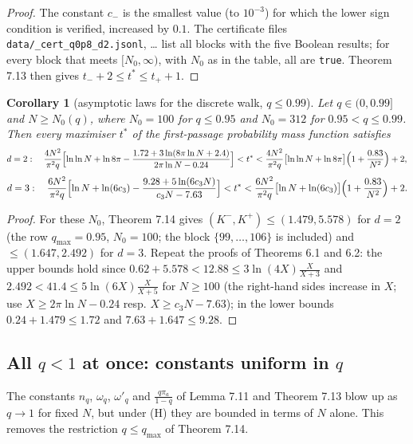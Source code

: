 \documentclass[11pt,a4paper]{article}
\newtheorem{corollary}[theorem]{Corollary}
\theoremstyle{definition}
\theoremstyle{remark}
\begin{document}
\begin{proof}
The constant $c_-$ is the smallest value (to $10^{-3}$) for which the lower sign condition is verified, increased by $0.1$. The certificate files \texttt{data/\_\allowbreak cert\_\allowbreak q0p8\_\allowbreak d2.jsonl}, … list all blocks with the five Boolean results; for every block that meets $[N_0,\infty)$, with $N_0$ as in the table, all are \texttt{true}. Theorem 7.13 then gives $t_-+2\le t^*\le t_++1$.
\end{proof}

\begin{corollary}[{asymptotic laws for the discrete walk, $q\le0.99$}]
Let $q\in(0,0.99]$ and $N\ge N_0(q)$, where $N_0=100$ for $q\le0.95$ and $N_0=312$ for $0.95<q\le0.99$. Then every maximiser $t^*$ of the first-passage probability mass function satisfies
\begin{equation*}
d=2:\quad \frac{4N^2}{\pi^2q}\Bigl[\ln\ln N+\ln8\pi-\frac{1.72+3\ln(8\pi\ln N+2.4)}{2\pi\ln N-0.24}\Bigr]<t^*<\frac{4N^2}{\pi^2q}\bigl[\ln\ln N+\ln8\pi\bigr]\Bigl(1+\frac{0.83}{N^2}\Bigr)+2,
\end{equation*}
\begin{equation*}
d=3:\quad \frac{6N^2}{\pi^2q}\Bigl[\ln N+\ln(6c_3)-\frac{9.28+5\ln(6c_3N)}{c_3N-7.63}\Bigr]<t^*<\frac{6N^2}{\pi^2q}\bigl[\ln N+\ln(6c_3)\bigr]\Bigl(1+\frac{0.83}{N^2}\Bigr)+2 .
\end{equation*}
\end{corollary}

\begin{proof}
For these $N_0$, Theorem 7.14 gives $(K^-,K^+)\le(1.479,5.578)$ for $d=2$ (the row $q_{\max}=0.95$, $N_0=100$; the block $\{99,\dots,106\}$ is included) and $\le(1.647,2.492)$ for $d=3$. Repeat the proofs of Theorems 6.1 and 6.2: the upper bounds hold since $0.62+5.578<12.88\le3\ln(4X)\frac{X}{X+3}$ and $2.492<41.4\le5\ln(6X)\frac{X}{X+5}$ for $N\ge100$ (the right-hand sides increase in $X$; use $X\ge2\pi\ln N-0.24$ resp. $X\ge c_3N-7.63$); in the lower bounds $0.24+1.479\le1.72$ and $7.63+1.647\le9.28$.
\end{proof}

\subsection{All $q<1$ at once: constants uniform in $q$}

The constants $n_q$, $\omega_q$, $\omega'_q$ and $\frac{q\pi_a}{1-q}$ of Lemma 7.11 and Theorem 7.13 blow up as $q\to1$ for fixed $N$, but under (H) they are bounded in terms of $N$ alone. This removes the restriction $q\le q_{\max}$ of Theorem 7.14.
\end{document}
